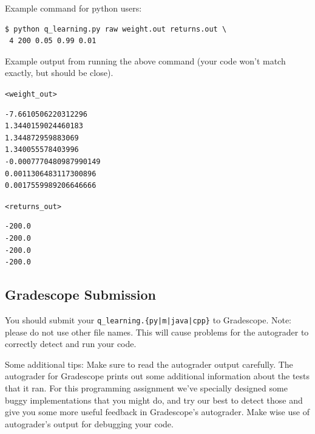\documentclass[11pt]{article}
\numberwithin{equation}{section} %
\numberwithin{figure}{section} %
\numberwithin{table}{section} %
\begin{document}
Example command for python users:
\begin{lstlisting}[language=Shell]
$ python q_learning.py raw weight.out returns.out \ 
 4 200 0.05 0.99 0.01
\end{lstlisting}

Example output from running the above command (your code won't match exactly, but should be close).

\texttt{<weight\_out>}
\begin{lstlisting}
-7.6610506220312296
1.3440159024460183
1.344872959883069
1.340055578403996
-0.0007770480987990149
0.0011306483117300896
0.0017559989206646666
\end{lstlisting}

\texttt{<returns\_out>}
\begin{lstlisting}
-200.0
-200.0
-200.0
-200.0
\end{lstlisting}

\subsection{Gradescope Submission}

You should submit your \texttt{q\_learning.\{py|m|java|cpp\}} to Gradescope.
Note: please do not use other file names. This will cause problems for the autograder to correctly detect and run your code.

Some additional tips: 
Make sure to read the autograder output carefully. The autograder for Gradescope prints out some additional 
information about the tests that it ran. For this programming assignment we've specially designed some buggy implementations that you might do, and try our best to detect those and give you some more useful feedback in Gradescope's autograder. Make wise use of autograder's output for debugging your code. 
 
\end{document}
